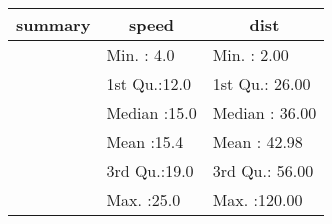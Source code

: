 \begin{table}[!tbp]
\begin{center}
\begin{tabular}{lll}
\hline\hline
\multicolumn{1}{l}{summary}&\multicolumn{1}{c}{    speed}&\multicolumn{1}{c}{     dist}\tabularnewline
\hline
&Min.   : 4.0  &Min.   :  2.00  \tabularnewline
&1st Qu.:12.0  &1st Qu.: 26.00  \tabularnewline
&Median :15.0  &Median : 36.00  \tabularnewline
&Mean   :15.4  &Mean   : 42.98  \tabularnewline
&3rd Qu.:19.0  &3rd Qu.: 56.00  \tabularnewline
&Max.   :25.0  &Max.   :120.00  \tabularnewline
\hline
\end{tabular}\end{center}

\end{table}
